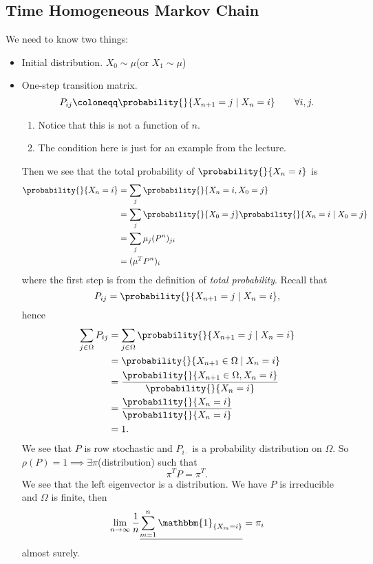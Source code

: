 \subsection{Time Homogeneous Markov Chain}
We need to know two things:
\begin{itemize}
	\item Initial distribution. \(X_0 \sim \mu\)(or \(X_1\sim \mu\))
	\item One-step transition matrix.
	      \[
		      P_{ij} \coloneqq \probability{}{X_{n+1} = j \mid X_n = i}\qquad \forall i, j.
	      \]


	      \begin{note}
		      \begin{enumerate}
			      \item Notice that this is not a function of \(n\).
			      \item The condition here is just for an example from the lecture.
		      \end{enumerate}
	      \end{note}

	      Then we see that the total probability of \(\probability{}{X_n = i}\) is
	      \[
		      \begin{split}
			      \probability{}{X_n = i} &= \sum_j \probability{}{X_n = i, X_0 = j}\\
			      &= \sum_j \probability{}{X_0 = j}\probability{}{X_n = i  \mid  X_0 = j}\\
			      &=\sum_j \mu_{j} (P^n)_{ji}\\
			      &= (\mu^{T} P^n)_i
		      \end{split}
	      \]
	      where the first step is from the definition of \emph{total probability}. Recall that
	      \[
		      P_{ij} = \probability{}{X_{n+1} = j \mid X_n = i},
	      \]
	      hence
	      \[
		      \begin{split}
			      \sum_{j\in \Omega} P_{ij} &= \sum_{j\in \Omega} \probability{}{X_{n+1} = j \mid X_n = i}\\
			      &= \probability{}{X_{n+1}\in \Omega \mid X_n = i}\\
			      &= \frac{\probability{}{X_{n+1}\in \Omega, X_n = i} }{\probability{}{X_n = i} }\\
			      &= \frac{\probability{}{X_n = i} }{\probability{}{X_n = i} }\\
			      &= 1.
		      \end{split}
	      \]
	      We see that \(P\) is row stochastic and \(P_{i\cdot}\) is a probability distribution on \(\Omega\). So \(\rho(P) = 1\implies \exists  \pi\)(distribution) such that
	      \[
		      \pi^{T} P = \pi^{T}.
	      \]
	      We see that the left eigenvector is a distribution. We have \(P\) is irreducible and \(\Omega\) is finite, then
	      \[
		      \lim_{n\to \infty } \frac{1}{n}\underline{\sum\limits_{m=1}^{n}  \mathbbm{1}_{\left\{ X_m = i \right\} }} = \pi_i
	      \]
	      almost surely.
\end{itemize}

